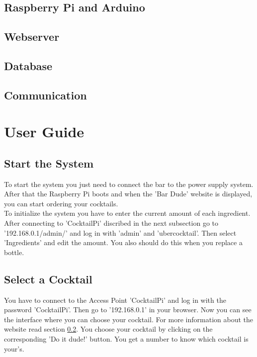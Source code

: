 \documentclass{acm_proc_article-sp}
\begin{document}
\subsection{Raspberry Pi and Arduino}
\subsection{Webserver}\label{sec:webserver}
\subsection{Database}
\subsection{Communication}
\section{User Guide}
\subsection{Start the System}
To start the system you just need to connect the bar to the power supply system. After that the Raspberry Pi boots and when the 'Bar Dude' website is displayed, you can start ordering your cocktails. \\
To initialize the system you have to enter the current amount of each ingredient. After connecting to 'CocktailPi' discribed in the next subsection go to '192.168.0.1/admin/' and log in with 'admin' and 'ubercocktail'. Then select 'Ingredients' and edit the amount. You also should do this when you replace a bottle.
 \subsection{Select a Cocktail}
You have to connect to the Access Point 'CocktailPi' and log in with the password 'CocktailPi'. Then go to '192.168.0.1' in your browser. Now you can see the interface where you can choose your cocktail. For more information about the website read section \ref{sec:webserver}. You choose your cocktail by clicking on the corresponding 'Do it dude!' button. You get a number to know which cocktail is your's.
\end{document}
